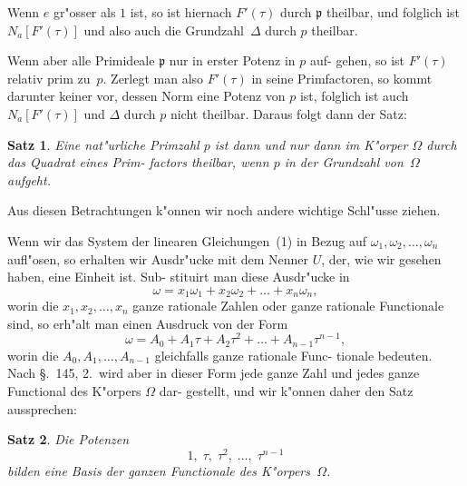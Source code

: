 \documentclass[12pt,a4paper]{article}
\theoremstyle{weber}
\newtheorem*{satz}{Satz}
\begin{document}
Wenn $e$ gr"osser als $1$ ist, so ist hiernach $F'(\tau)$ durch $\mathfrak{p}$
theilbar, und folglich ist $N_a[F'(\tau)]$ und also auch die Grundzahl~$\varDelta$
durch $p$ theilbar.

Wenn aber alle Primideale $\mathfrak{p}$ nur in erster Potenz in $p$ auf-
gehen, so ist $F'(\tau)$ relativ prim zu~$p$. Zerlegt man also $F'(\tau)$
in seine Primfactoren, so kommt darunter keiner vor, dessen
Norm eine Potenz von $p$ ist, folglich ist auch $N_a[F'(\tau)]$ und $\varDelta$
durch $p$ nicht theilbar. Daraus folgt dann der Satz:

\begin{satz}
Eine nat"urliche Primzahl $p$ ist dann und nur
dann im K"orper $\varOmega$ durch das Quadrat eines Prim-
factors theilbar, wenn $p$ in der Grundzahl von~$\varOmega$
aufgeht.
\end{satz}

Aus diesen Betrachtungen k"onnen wir noch andere wichtige
Schl"usse ziehen.

Wenn wir das System der linearen Gleichungen~(1) in Bezug
auf $\omega_1, \omega_2, \dots, \omega_n$ aufl"osen, so erhalten wir Ausdr"ucke mit dem
Nenner $U$, der, wie wir gesehen haben, eine Einheit ist. Sub-
stituirt man diese Ausdr"ucke in
\begin{equation}\label{eq:12}
\omega = x_1\omega_1 + x_2\omega_2 + \dots + x_n\omega_n,
\end{equation}
worin die $x_1, x_2, \dots, x_n$ ganze rationale Zahlen oder ganze
rationale Functionale sind, so erh"alt man einen Ausdruck von
der Form
\begin{equation}\label{eq:13}
\omega = A_0 + A_1\tau + A_2\tau^2 + \dots + A_{n-1}\tau^{n-1},
\end{equation}
worin die $A_0, A_1, \dots, A_{n-1}$ gleichfalls ganze rationale Func-
tionale bedeuten. Nach \S.~145, 2.\ wird aber in dieser Form jede
ganze Zahl und jedes ganze Functional des K"orpers $\varOmega$ dar-
gestellt, und wir k"onnen daher den Satz aussprechen:

\begin{satz}
Die Potenzen
\[
1,\; \tau,\; \tau^2,\; \dots,\; \tau^{n-1}
\]
bilden eine Basis der ganzen Functionale des
K"orpers~$\varOmega$.
\end{satz}
\end{document}
